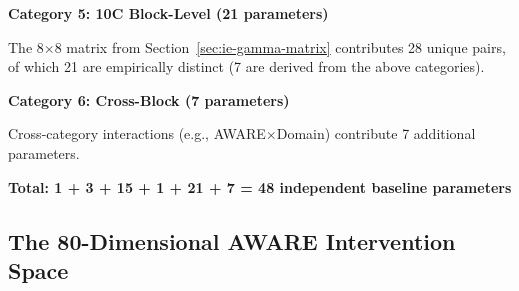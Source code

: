 \begin{tcolorbox}[colback=gray!5!white, colframe=gray!75!black,
    title=\textbf{EIT-EMP-1-D2: Complete Baseline Parameter Specification}]
\textbf{Category 5: 10C Block-Level (21 parameters)}

The 8$\times$8 matrix from Section~\ref{sec:ie-gamma-matrix} contributes 28 unique pairs, of which 21 are empirically distinct (7 are derived from the above categories).

\textbf{Category 6: Cross-Block (7 parameters)}

Cross-category interactions (e.g., AWARE$\times$Domain) contribute 7 additional parameters.

\textbf{Total: 1 + 3 + 15 + 1 + 21 + 7 = 48 independent baseline parameters}

\end{tcolorbox}

\subsection{The 80-Dimensional AWARE Intervention Space}
\label{subsec:80d-aware-space}

